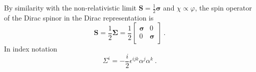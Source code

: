    By similarity with the non-relativistic limit $\mathbf S = \frac{1}{2} \boldsymbol \sigma$ and $\chi \propto \varphi$, the spin operator of the Dirac spinor in the Dirac representation is \begin{equation*}
        \mathbf S = \frac{1}{2} \boldsymbol \Sigma = \frac{1}{2} \begin{bmatrix}
            \boldsymbol \sigma & 0 \\ 
            0 & \boldsymbol \sigma \\ 
        \end{bmatrix} ~.
    \end{equation*}
    In index notation
    \begin{equation*}
        \Sigma^i = - \frac{i}{2} \epsilon^{ijk} \alpha^j \alpha^k ~.
    \end{equation*}

